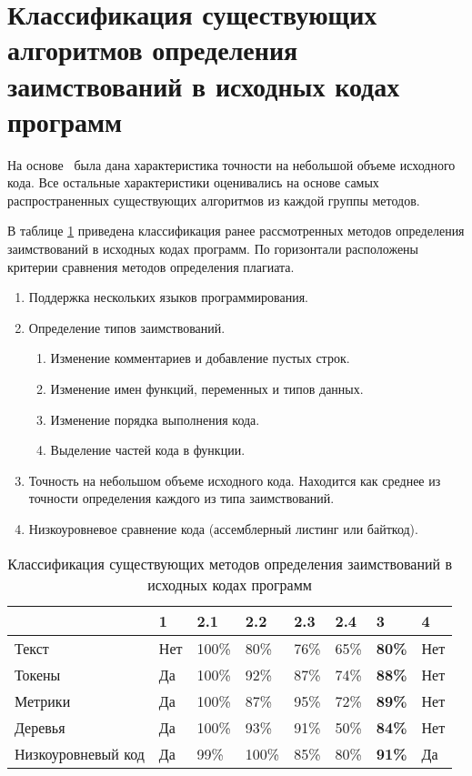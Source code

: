 \section{Классификация существующих алгоритмов определения заимствований в исходных кодах программ}

На основе~\cite{treb} была дана характеристика точности на небольшой объеме исходного кода. Все остальные характеристики оценивались на основе самых распространенных существующих алгоритмов из каждой группы методов.

В таблице \ref{tab:compare} приведена классификация ранее рассмотренных методов определения заимствований в исходных кодах программ. По горизонтали расположены критерии сравнения методов определения плагиата.
\begin{enumerate}
	\item Поддержка нескольких языков программирования.
	\item Определение типов заимствований.
	\begin{enumerate}
		\item[2.1)] Изменение комментариев и добавление пустых строк.
		\item[2.2)] Изменение имен функций, переменных и типов данных.
		\item[2.3)] Изменение порядка выполнения кода.
		\item[2.4)] Выделение частей кода в функции.
	\end{enumerate}
	\item Точность на небольшом объеме исходного кода. Находится как среднее из точности определения каждого из типа заимствований. 
	\item Низкоуровневое сравнение кода (ассемблерный листинг или байткод).
\end{enumerate}


\begin{table}[hbtp]
	\begin{center}
		\begin{flushleft}
			\caption{\label{tab:compare}Классификация существующих методов определения заимствований в исходных кодах программ}
		\end{flushleft}
		\begin{tabular}{|l | l | l | l | l | l | l | l |} 
			\hline 
             ~					& {1}	 &    {2.1} &   {2.2} & {2.3} & {2.4} & {3} & {4} \\ \hline
			Текст  & Нет  &   100\%  & 80\%    &  76\%   &  65\%    &  \textbf{80\% }& Нет  \\ \hline
			Токены  &  Да &   100\%  &  92\%   & 87\%  &  74\%  &    \textbf{88\% } & Нет  \\ \hline
		    Метрики &   Да &   100\%   &  87\%   & 95\%    &  72\%   & \textbf{89\% }& Нет  \\ \hline
			Деревья   &   Да &    100\%  &  93\%   &  91\%   &  50\%  &  \textbf{84\%}& Нет  \\ \hline
			Низкоуровневый код &  Да &    99\%  &  100\%   &   85\%   &   80\%  &  \textbf{91\%}& Да \\  \hline
		\end{tabular}
	\end{center}
\end{table}